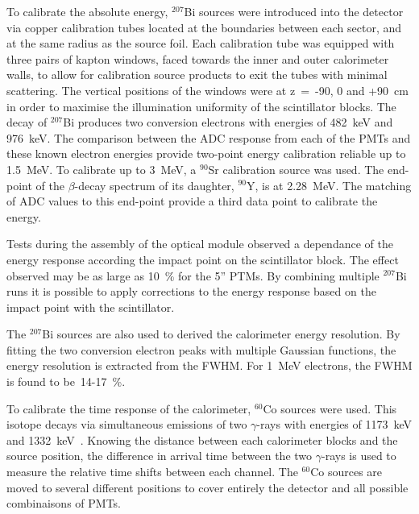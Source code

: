 \documentclass[main.tex]{subfiles}
\begin{document}
\NI To calibrate the absolute energy, $^{\text{207}}$Bi sources were introduced into the detector via copper calibration tubes located at the boundaries between each sector, and at the same radius as the source foil. Each calibration tube was equipped with three pairs of kapton windows, faced towards the inner and outer calorimeter walls, to allow for calibration source products to exit the tubes with minimal scattering. The vertical positions of the windows were at z~=~-90, 0 and +90~cm in order to maximise the illumination uniformity of the scintillator blocks. The decay of $^{\text{207}}$Bi produces two conversion electrons with energies of 482~keV and 976~keV. The comparison between the ADC response from each of the PMTs and these known electron energies provide two-point energy calibration reliable up to 1.5~MeV. To calibrate up to 3~MeV, a $^{\text{90}}$Sr calibration source was used. The end-point of the $\beta$-decay spectrum of its daughter, $^{\text{90}}$Y, is at 2.28~MeV. The matching of ADC values to this end-point provide a third data point to calibrate the energy.


\bigskip


\NI Tests during the assembly of the optical module observed a dependance of the energy response according the impact point on the scintillator block. The effect observed may be as large as 10~\% for the 5'' PTMs. By combining multiple $^{\text{207}}$Bi runs it is possible to apply corrections to the energy response based on the impact point with the scintillator.


\bigskip


\NI The $^{\text{207}}$Bi sources are also used to derived the calorimeter energy resolution. By fitting the two conversion electron peaks with multiple Gaussian functions, the energy resolution is extracted from the FWHM. For 1~MeV electrons, the FWHM is found to be~14-17~\%. 
 
 
\bigskip


\NI To calibrate the time response of the calorimeter, $^{\text{60}}$Co sources were used. This isotope decays via simultaneous emissions of two $\gamma$-rays with energies of 1173~keV and 1332~keV~\cite{DecayCo60}. Knowing the distance between each calorimeter blocks and the source position, the difference in arrival time between the two $\gamma$-rays is used to measure the relative time shifts between each channel. The $^{\text{60}}$Co sources are moved to several different positions to cover entirely the detector and all possible combinaisons of PMTs.
\end{document}
